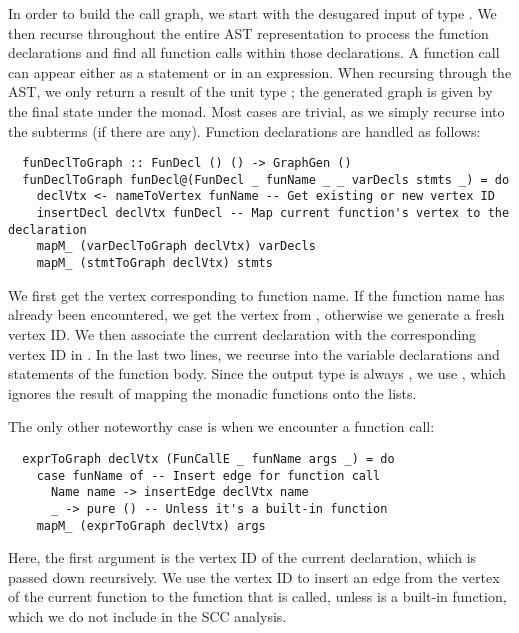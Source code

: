 In order to build the call graph, we start with the desugared input of type
. We then recurse throughout the entire AST
representation to process the function declarations and find all function calls
within those declarations. A function call can appear either as a statement or
in an expression.
When recursing through the AST, we only return a result of the unit type
\haskell{()}; the generated graph is given by the final state under the
 monad.
Most cases are trivial, as we simply recurse into the subterms (if there are
any). Function declarations are handled as follows:
\begin{verbatim}
  funDeclToGraph :: FunDecl () () -> GraphGen ()
  funDeclToGraph funDecl@(FunDecl _ funName _ _ varDecls stmts _) = do
    declVtx <- nameToVertex funName -- Get existing or new vertex ID
    insertDecl declVtx funDecl -- Map current function's vertex to the declaration
    mapM_ (varDeclToGraph declVtx) varDecls
    mapM_ (stmtToGraph declVtx) stmts
\end{verbatim}
%
We first get the vertex corresponding to function name. If the function name has
already been encountered, we get the vertex from , otherwise we
generate a fresh vertex ID.
We then associate the current declaration with the corresponding vertex ID in
. In the last two lines, we recurse into the variable declarations
and statements of the function body. Since the output type is always
, we use , which ignores the result of mapping
the monadic functions onto the lists.

The only other noteworthy case is when we encounter a function call:
\begin{verbatim}
  exprToGraph declVtx (FunCallE _ funName args _) = do
    case funName of -- Insert edge for function call
      Name name -> insertEdge declVtx name
      _ -> pure () -- Unless it's a built-in function
    mapM_ (exprToGraph declVtx) args
\end{verbatim}
%
Here, the first argument is the vertex ID of the current declaration, which is
passed down recursively. We use the vertex ID to insert an edge from the vertex
of the current function to the function that is called, unless  is
a built-in function, which we do not include in the SCC analysis.

